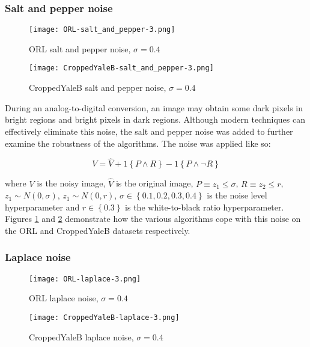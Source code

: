 \documentclass{article} %
\begin{document}
\subsubsection{Salt and pepper noise}
\begin{figure}
\texttt{[image: ORL-salt\_and\_pepper-3.png]}
\caption{ORL salt and pepper noise, $\sigma=0.4$ \label{fig:ORL-salt_and_pepper-3}}
\end{figure}
\begin{figure}
\texttt{[image: CroppedYaleB-salt\_and\_pepper-3.png]}
\caption{CroppedYaleB salt and pepper noise, $\sigma=0.4$ \label{fig:CroppedYaleB-salt_and_pepper-3}}
\end{figure}

During an analog-to-digital conversion, an image may obtain some dark pixels in bright regions and bright pixels in dark regions. \cite{salt-and-pepper} Although modern techniques can effectively eliminate this noise, the salt and pepper noise was added to further examine the robustness of the algorithms. The noise was applied like so:

\begin{equation}
V = \hat{V} + 1\left\{P \land R\right\} - 1\left\{P \land \lnot R\right\}
\end{equation}

where $V$ is the noisy image, $\hat{V}$ is the original image, $P \equiv z_1 \leq \sigma$, $R \equiv z_2 \leq r$, $z_1 \sim N\left(0,\sigma\right)$, $z_1 \sim N\left(0,r\right)$, $\sigma \in \left\{0.1,0.2,0.3,0.4\right\}$ is the noise level hyperparameter and $r \in \left\{0.3\right\} $ is the white-to-black ratio hyperparameter. Figures \ref{fig:ORL-salt_and_pepper-3} and \ref{fig:CroppedYaleB-salt_and_pepper-3} demonstrate how the various algorithms cope with this noise on the ORL and CroppedYaleB datasets respectively.

\subsubsection{Laplace noise}
\begin{figure}
\texttt{[image: ORL-laplace-3.png]}
\caption{ORL laplace noise, $\sigma=0.4$ \label{fig:ORL-laplace-3}}
\end{figure}
\begin{figure}
\texttt{[image: CroppedYaleB-laplace-3.png]}
\caption{CroppedYaleB laplace noise, $\sigma=0.4$ \label{fig:CroppedYaleB-laplace-3}}
\end{figure}
\end{document}
